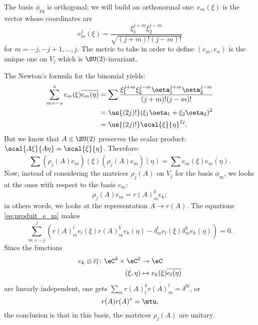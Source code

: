 The basis $\phi_{pq}$ is orthogonal; we will build an orthonormal one: $e_m(\xi)$ is the vector whose coordinates are
\begin{equation}
e_m^j(\xi)=\frac{ \xi_1^{j+m}\xi_2^{j-m} }{\sqrt{ (j+m)!(j-m)! }}
\end{equation}
for $m=-j,-j+1,\ldots,j$. The metric to take in order to define $(e_m,e_n)$ is the unique one on $V_j$ which is $\SU(2)$-invariant.

The Newton's formula for the binomial yields:
\begin{equation}
\begin{split}
  \sum_{m=-s}^s e_m(\xi)\overline{e_m(\eta)}
        &=\sum\frac{ \xi_1^{j+m}\xi_2^{j-m}\oeta_1^{j+m}\oeta_2^{j-m} }{(j+m)!(j-m)!}\\
	&=\us{(2j)!}(\xi_1\oeta_1+\xi_2\oeta_2)^2\\
	&=\us{(2j)!}\scal{\xi}{\eta}^{2j}.
\end{split}
\end{equation}
But we know that $A\in\SU(2)$ preserves the scalar product: $\scal{A\xi}{A\eta}=\scal{\xi}{\eta}$. Therefore:
\begin{equation}\label{eq:produit_e_m}
\sum (\rho_j(A)e_m)(\xi)\overline{ (\rho_j(A)e_m)(\eta) }=\sum e_m(\xi)\overline{e_m(\eta)}.
\end{equation}
Now, instead of considering the matrices $\rho_j(A)$ on $V_j$ for the basis $\phi_m$, we looks at the ones with respect to the basis $e_m$:
\begin{equation}
\rho_j(A)e_m=r(A)^k_me_k;
\end{equation}
in others words, we looks at the representation $A\to r(A)$. The equations \eqref{eq:produit_e_m} makes
\[
  \sum_{m=-j}^j\left(
                      r(A)^l_me_l(\xi)\overline{ r(A)^k_me_k(\eta)   }
		        -\delta^l_me_l(\xi)\delta^k_me_k(\eta)
                \right)=0.
\]
Since the functions
\begin{equation}
\begin{aligned}
 e_k\otimes\overline{e_l}\colon \eC^2\times\eC^2 &\to \eC \\
(\xi,\eta) &\mapsto  e_k(\xi)\overline{e_l(\eta)}
\end{aligned}
\end{equation}
 are linearly independent, one gets $\sum_m r(A)^k_l\overline{r(A)^l_m}=\delta^{kl}$, or
\begin{equation}
r(A)r(A)^*=\mtu,
\end{equation}
the conclusion is that in this basis, the matrices $\rho_j(A)$ are unitary.

